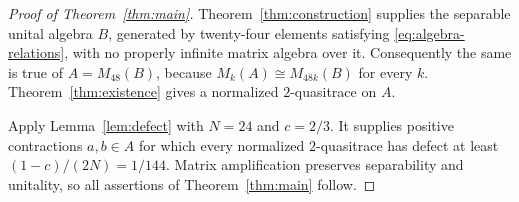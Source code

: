 \begin{proof}[Proof of Theorem~\ref{thm:main}]
Theorem~\ref{thm:construction} supplies the separable unital algebra
\(B\), generated by twenty-four elements satisfying
\eqref{eq:algebra-relations}, with no properly infinite matrix
algebra over it. Consequently the same is true of \(A=M_{48}(B)\),
because \(M_k(A)\cong M_{48k}(B)\) for every \(k\).
Theorem~\ref{thm:existence} gives a normalized \(2\)-quasitrace on \(A\).

Apply Lemma~\ref{lem:defect} with \(N=24\) and \(c=2/3\).
It supplies positive contractions \(a,b\in A\) for which every
normalized \(2\)-quasitrace has defect at least
\((1-c)/(2N)=1/144\). Matrix amplification preserves separability
and unitality, so all assertions of Theorem~\ref{thm:main} follow.
\end{proof}
